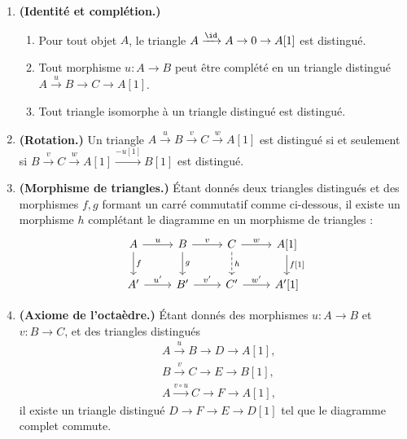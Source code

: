 \begin{definition}[Axiomes TR1--TR4]\label{def:TR-axioms}
\begin{enumerate}[label=\textbf{(TR\arabic*)}]
\item\label{TR1} \textbf{(Identité et complétion.)}
  \begin{enumerate}[label=(\alph*)]
  \item Pour tout objet $A$, le triangle
    $A \xrightarrow{\id} A \to 0 \to A[1]$ est distingué.
  \item Tout morphisme $u \colon A \to B$ peut être complété en un
    triangle distingué $A \xrightarrow{u} B \to C \to A[1]$.
  \item Tout triangle isomorphe à un triangle distingué est distingué.
  \end{enumerate}

\item\label{TR2} \textbf{(Rotation.)}
  Un triangle $A \xrightarrow{u} B \xrightarrow{v} C \xrightarrow{w} A[1]$
  est distingué si et seulement si
  $B \xrightarrow{v} C \xrightarrow{w} A[1] \xrightarrow{-u[1]} B[1]$
  est distingué.

\item\label{TR3} \textbf{(Morphisme de triangles.)}
  Étant donnés deux triangles distingués et des morphismes $f, g$
  formant un carré commutatif comme ci-dessous, il existe un morphisme $h$
  complétant le diagramme en un morphisme de triangles :
\[
\begin{tikzcd}
A \arrow[r, "u"] \arrow[d, "f"] & B \arrow[r, "v"] \arrow[d, "g"]
  & C \arrow[r, "w"] \arrow[d, dashed, "h"] & A{[1]} \arrow[d, "f{[1]}"] \\
A' \arrow[r, "u'"] & B' \arrow[r, "v'"] & C' \arrow[r, "w'"] & A'{[1]}
\end{tikzcd}
\]

\item\label{TR4} \textbf{(Axiome de l'octaèdre.)}
  Étant donnés des morphismes $u \colon A \to B$ et $v \colon B \to C$,
  et des triangles distingués
  \begin{align*}
    & A \xrightarrow{u} B \to D \to A[1], \\
    & B \xrightarrow{v} C \to E \to B[1], \\
    & A \xrightarrow{v \circ u} C \to F \to A[1],
  \end{align*}
  il existe un triangle distingué $D \to F \to E \to D[1]$ tel que
  le diagramme complet commute.
\end{enumerate}
\end{definition}

